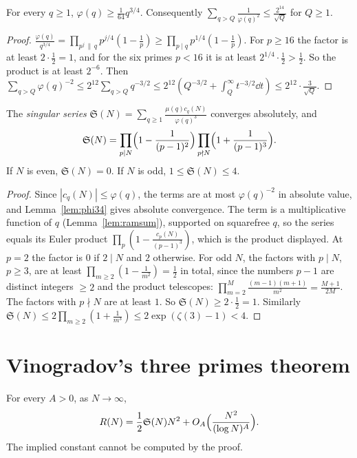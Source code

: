 \begin{lemma}\label{lem:phi34}
For every $q\ge1$, $\varphi(q)\ge\frac1{64}q^{3/4}$. Consequently $\sum_{q>Q}\frac1{\varphi(q)^2}\le\frac{2^{14}}{\sqrt Q}$ for $Q\ge1$.
\end{lemma}
\begin{proof}
$\frac{\varphi(q)}{q^{3/4}}=\prod_{p^j\,\|\,q}p^{j/4}(1-\frac1p)\ge\prod_{p\mid q}p^{1/4}(1-\frac1p)$. For $p\ge16$ the factor is at least $2\cdot\frac12=1$, and for the six primes $p<16$ it is at least $2^{1/4}\cdot\frac12>\frac12$. So the product is at least $2^{-6}$. Then $\sum_{q>Q}\varphi(q)^{-2}\le2^{12}\sum_{q>Q}q^{-3/2}\le2^{12}(Q^{-3/2}+\int_Q^\infty t^{-3/2}\dd t)\le2^{12}\cdot\frac3{\sqrt Q}$.
\end{proof}

\begin{proposition}\label{prop:sing3}
The \emph{singular series} $\mathfrak S(N)=\sum_{q\ge1}\frac{\mu(q)c_q(N)}{\varphi(q)^3}$ converges absolutely, and
\[
\mathfrak S(N)=\prod_{p\mid N}\Bigl(1-\frac1{(p-1)^2}\Bigr)\prod_{p\nmid N}\Bigl(1+\frac1{(p-1)^3}\Bigr).
\]
If $N$ is even, $\mathfrak S(N)=0$. If $N$ is odd, $1\le\mathfrak S(N)\le4$.
\end{proposition}
\begin{proof}
Since $|c_q(N)|\le\varphi(q)$, the terms are at most $\varphi(q)^{-2}$ in absolute value, and Lemma~\ref{lem:phi34} gives absolute convergence. The term is a multiplicative function of $q$ (Lemma~\ref{lem:ramsum}), supported on squarefree $q$, so the series equals its Euler product $\prod_p(1-\frac{c_p(N)}{(p-1)^3})$, which is the product displayed. At $p=2$ the factor is $0$ if $2\mid N$ and $2$ otherwise. For odd $N$, the factors with $p\mid N$, $p\ge3$, are at least $\prod_{m\ge2}(1-\frac1{m^2})=\frac12$ in total, since the numbers $p-1$ are distinct integers $\ge2$ and the product telescopes: $\prod_{m=2}^M\frac{(m-1)(m+1)}{m^2}=\frac{M+1}{2M}$. The factors with $p\nmid N$ are at least $1$. So $\mathfrak S(N)\ge2\cdot\frac12=1$. Similarly $\mathfrak S(N)\le2\prod_{m\ge2}(1+\frac1{m^3})\le2\exp(\zeta(3)-1)<4$.
\end{proof}

\section{Vinogradov's three primes theorem}

\begin{theorem}[Vinogradov, 1937]\label{thm:threeprimes}
For every $A>0$, as $N\to\infty$,
\[
R(N)=\frac12\mathfrak S(N)N^2+O_A\Bigl(\frac{N^2}{(\log N)^A}\Bigr).
\]
The implied constant cannot be computed by the proof.
\end{theorem}

